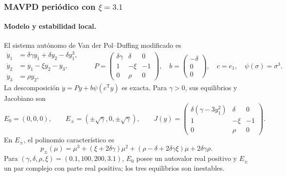 \subsubsection{MAVPD periódico con \texorpdfstring{\(\xi=3.1\)}{xi=3.1}}

\paragraph{Modelo y estabilidad local.}
El sistema autónomo de Van der Pol--Duffing modificado
\cite{matouk2023} es
\begin{equation}
 \begin{aligned}
  \dot y_1&=\delta\gamma y_1+\delta y_2-\delta y_1^3,\\
  \dot y_2&=y_1-\xi y_2-y_3,\\
  \dot y_3&=\rho y_2,
 \end{aligned}
 \qquad
 P=\begin{pmatrix}
 \delta\gamma&\delta&0\\1&-\xi&-1\\0&\rho&0
 \end{pmatrix},\quad
 b=\begin{pmatrix}-\delta\\0\\0\end{pmatrix},\quad
 c=e_1,\quad \psi(\sigma)=\sigma^3.
 \label{ncbench:eq:mavpd-lure}
\end{equation}
La descomposición \(\dot y=Py+b\psi(c^{\mathsf T}y)\) es exacta. Para
\(\gamma>0\), sus equilibrios y Jacobiano son
\begin{equation}
 E_0=(0,0,0),\qquad
 E_\pm=(\pm\sqrt{\gamma},0,\pm\sqrt{\gamma}),\qquad
 J(y)=\begin{pmatrix}
 \delta(\gamma-3y_1^2)&\delta&0\\
 1&-\xi&-1\\0&\rho&0
 \end{pmatrix}.
 \label{ncbench:eq:mavpd-equilibria-jacobian}
\end{equation}
En \(E_\pm\), el polinomio característico es
\begin{equation}
 p_\pm(\mu)=\mu^3+(\xi+2\delta\gamma)\mu^2
 +(\rho-\delta+2\delta\gamma\xi)\mu+2\delta\gamma\rho.
 \label{ncbench:eq:mavpd-local-polynomial}
\end{equation}
Para \((\gamma,\delta,\rho,\xi)=(0.1,100,200,3.1)\), \(E_0\) posee un
autovalor real positivo y \(E_\pm\) un par complejo con parte real positiva;
los tres equilibrios son inestables.

